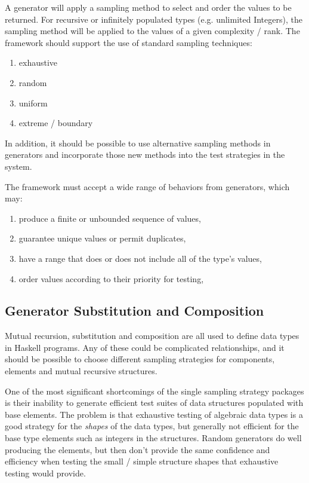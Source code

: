 A generator will apply a sampling method to select and order the values to be returned.
For recursive or infinitely populated types (e.g. unlimited Integers),
the sampling method will be applied to the values of a given complexity / rank.
The framework should support the use of standard sampling techniques:
\begin{enumerate}
	\item exhaustive
	\item random
	\item uniform
	\item extreme / boundary
\end{enumerate}
In addition, it should be possible to use alternative sampling methods in generators
and incorporate those new methods into the test strategies in the system.

The framework must accept a wide range of behaviors from generators, which may:
\begin{enumerate}
	\item produce a finite or unbounded sequence of values,
	\item guarantee unique values or permit duplicates,
	\item have a range that does or does not include all of the type's values,
	\item order values according to their priority for testing,
\end{enumerate}


\subsection{ Generator Substitution and Composition } \label{sub:reqsubcomp}


Mutual recursion, substitution and composition are all used
to define data types in Haskell programs.
Any of these could be complicated relationships,
and it should be possible to choose different sampling strategies
for components, elements and mutual recursive structures.

One of the most significant shortcomings of the single sampling strategy packages
is their inability to generate efficient test suites of data structures populated with base elements.
The problem is that exhaustive testing of algebraic data types 
is a good strategy for the \emph{shapes} of the data types,
but generally not efficient for the base type elements such as integers in the structures.
Random generators do well producing the elements,
but then don't provide the same confidence and efficiency when testing
the small / simple structure shapes that exhaustive testing would provide.

